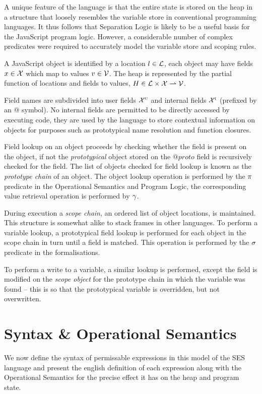 \documentclass[a4paper,notitlepage]{report}
\begin{document}
  A unique feature of the
  language is that the entire state is stored on the heap in a structure that
  loosely resembles the variable store in conventional programming languages. It
  thus follows that Separation Logic is likely to be a useful basis for the
  JavaScript program logic. However, a considerable number of complex predicates
  were required to accurately model the variable store and scoping rules.


  A JavaScript object is identified by a location $l \in \mathcal{L}$, each object may
  have fields $x \in \mathcal{X}$ which map to values $v \in \mathcal{V}$. The heap is
  represented by the partial function of locations and fields to
  values, $H \in \mathcal{L} \times \mathcal{X} \rightharpoonup \mathcal{V}$.

  Field names are subdivided into user fields $\mathcal{X}^{\textsc{u}}$ and internal fields
  $\mathcal{X}^{\textsc{i}}$ (prefixed by an @ symbol). No internal fields are permitted to be
  directly accessed by executing code, they are used by the language to store
  contextual information on objects for purposes such as prototypical name
  resolution and function closures.

  Field lookup on an object proceeds by checking whether the field is present on
  the object, if not the \emph{prototypical} object stored on the $@proto$ field
  is recursively checked for the field. The list of
  objects checked for field lookup is known as the \emph{prototype chain}
  of an object. The object lookup operation is performed by the $\pi$
  predicate in the Operational Semantics and Program Logic, the corresponding
  value retrieval operation is performed by $\gamma$.

  During execution a \emph{scope chain}, an ordered list of object locations, is
  maintained. This structure is somewhat alike to stack frames in other languages.
  To perform a variable lookup, a prototypical field lookup is performed for
  each object in the scope chain in turn until a field is matched. This
  operation is performed by the $\sigma$ predicate in the formalisations.

  To perform a write to a variable, a similar lookup is performed, except the
  field is modified on the \emph{scope object} for the prototype chain in which the
  variable was found -- this is so that the prototypical variable is overridden,
  but not overwritten.


\chapter{Syntax \& Operational Semantics}
  We now define the syntax of permissable expressions in this model of the SES
  language and present the english definition of each expression along with the
  Operational Semantics for the precise effect it has on the heap and program
  state.
\end{document}
